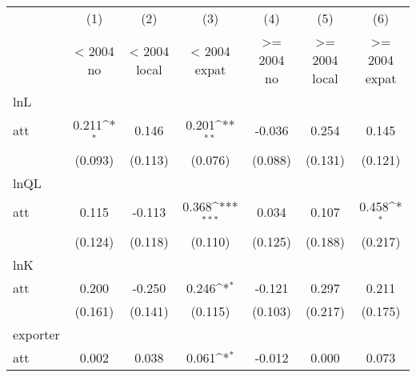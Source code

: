 {
\def\sym#1{\ifmmode^{#1}\else\(^{#1}\)\fi}
\begin{tabular}{l*{6}{c}}
\hline\hline
            &\multicolumn{1}{c}{(1)}&\multicolumn{1}{c}{(2)}&\multicolumn{1}{c}{(3)}&\multicolumn{1}{c}{(4)}&\multicolumn{1}{c}{(5)}&\multicolumn{1}{c}{(6)}\\
            &\multicolumn{1}{c}{< 2004  no}&\multicolumn{1}{c}{< 2004  local}&\multicolumn{1}{c}{< 2004  expat}&\multicolumn{1}{c}{>= 2004  no}&\multicolumn{1}{c}{>= 2004  local}&\multicolumn{1}{c}{>= 2004  expat}\\
\hline
lnL         &                     &                     &                     &                     &                     &                     \\
att         &       0.211\sym{*}  &       0.146         &       0.201\sym{**} &      -0.036         &       0.254         &       0.145         \\
            &     (0.093)         &     (0.113)         &     (0.076)         &     (0.088)         &     (0.131)         &     (0.121)         \\
\hline
lnQL        &                     &                     &                     &                     &                     &                     \\
att         &       0.115         &      -0.113         &       0.368\sym{***}&       0.034         &       0.107         &       0.458\sym{*}  \\
            &     (0.124)         &     (0.118)         &     (0.110)         &     (0.125)         &     (0.188)         &     (0.217)         \\
\hline
lnK         &                     &                     &                     &                     &                     &                     \\
att         &       0.200         &      -0.250         &       0.246\sym{*}  &      -0.121         &       0.297         &       0.211         \\
            &     (0.161)         &     (0.141)         &     (0.115)         &     (0.103)         &     (0.217)         &     (0.175)         \\
\hline
exporter    &                     &                     &                     &                     &                     &                     \\
att         &       0.002         &       0.038         &       0.061\sym{*}  &      -0.012         &       0.000         &       0.073         \\

\end{tabular}}
